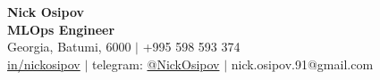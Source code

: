\documentclass[letterpaper,12pt]{fed-res} %
\begin{document}
\begin{center}
  \textbf{\Huge Nick Osipov} \\ \vspace{1pt}
  \textbf{MLOps Engineer} \\ \vspace{1pt}
  Georgia, Batumi, 6000 $|$ +995 598 593 374 \\ \vspace{1pt}  
  \href{https://www.linkedin.com/in/nickosipov/}{in/nickosipov} $|$ telegram: \href{https://t.me/NickOsipov}{@NickOsipov} $|$ nick.osipov.91@gmail.com \\ \vspace{1pt}
\end{center}







\end{document}
